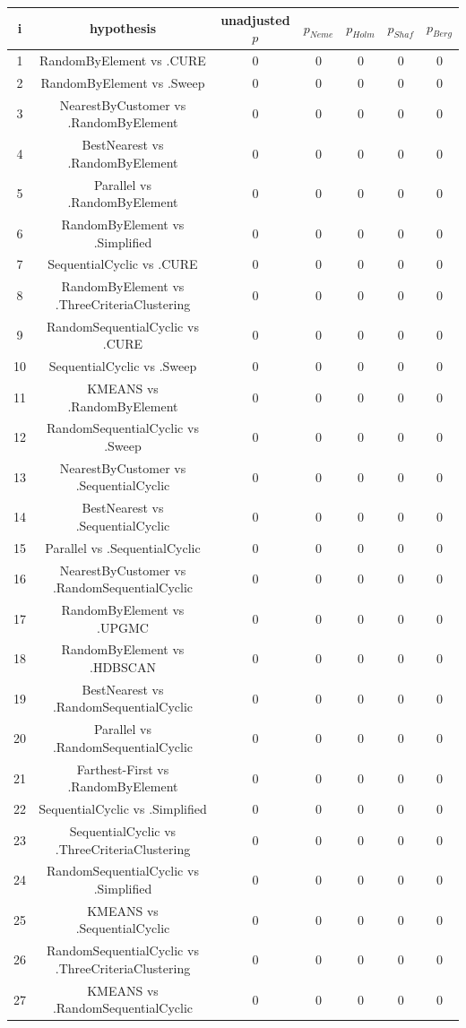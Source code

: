 \documentclass[a4paper,10pt]{article}
\begin{document}
\begin{landscape}
\begin{table}[!htp]
\centering\scriptsize
\begin{tabular}{ccccccc}
i&hypothesis&unadjusted $p$&$p_{Neme}$&$p_{Holm}$&$p_{Shaf}$&$p_{Berg}$\\
\hline1&RandomByElement vs .CURE&0&0&0&0&0\\
2&RandomByElement vs .Sweep&0&0&0&0&0\\
3&NearestByCustomer vs .RandomByElement&0&0&0&0&0\\
4&BestNearest vs .RandomByElement&0&0&0&0&0\\
5&Parallel vs .RandomByElement&0&0&0&0&0\\
6&RandomByElement vs .Simplified&0&0&0&0&0\\
7&SequentialCyclic vs .CURE&0&0&0&0&0\\
8&RandomByElement vs .ThreeCriteriaClustering&0&0&0&0&0\\
9&RandomSequentialCyclic vs .CURE&0&0&0&0&0\\
10&SequentialCyclic vs .Sweep&0&0&0&0&0\\
11&KMEANS vs .RandomByElement&0&0&0&0&0\\
12&RandomSequentialCyclic vs .Sweep&0&0&0&0&0\\
13&NearestByCustomer vs .SequentialCyclic&0&0&0&0&0\\
14&BestNearest vs .SequentialCyclic&0&0&0&0&0\\
15&Parallel vs .SequentialCyclic&0&0&0&0&0\\
16&NearestByCustomer vs .RandomSequentialCyclic&0&0&0&0&0\\
17&RandomByElement vs .UPGMC&0&0&0&0&0\\
18&RandomByElement vs .HDBSCAN&0&0&0&0&0\\
19&BestNearest vs .RandomSequentialCyclic&0&0&0&0&0\\
20&Parallel vs .RandomSequentialCyclic&0&0&0&0&0\\
21&Farthest-First vs .RandomByElement&0&0&0&0&0\\
22&SequentialCyclic vs .Simplified&0&0&0&0&0\\
23&SequentialCyclic vs .ThreeCriteriaClustering&0&0&0&0&0\\
24&RandomSequentialCyclic vs .Simplified&0&0&0&0&0\\
25&KMEANS vs .SequentialCyclic&0&0&0&0&0\\
26&RandomSequentialCyclic vs .ThreeCriteriaClustering&0&0&0&0&0\\
27&KMEANS vs .RandomSequentialCyclic&0&0&0&0&0\\

\end{tabular}
\end{table}
\end{landscape}
\end{document}
